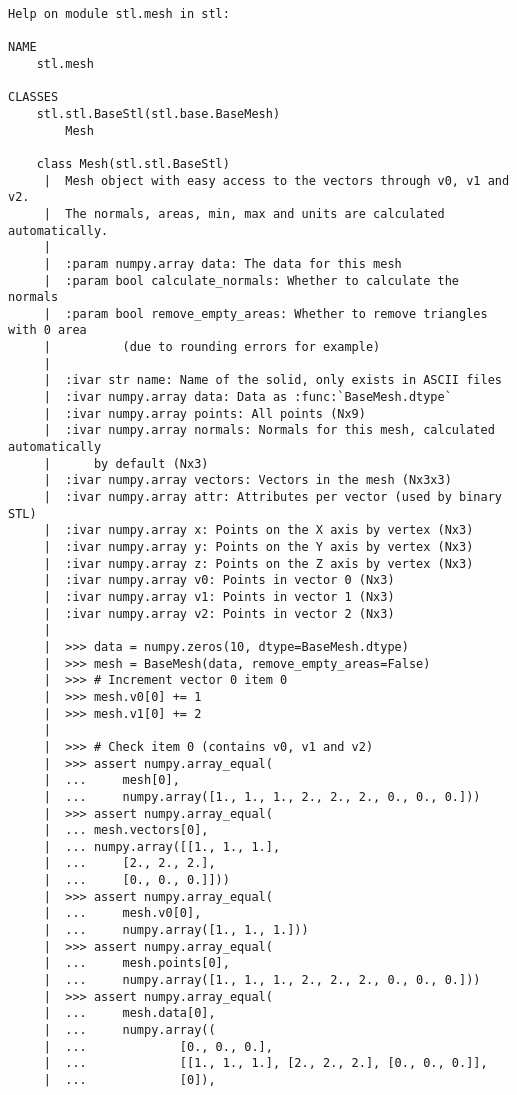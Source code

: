 \documentclass[12pt,fleqn]{article}\usepackage{../../common}
\begin{document}
\begin{verbatim}
Help on module stl.mesh in stl:

NAME
    stl.mesh

CLASSES
    stl.stl.BaseStl(stl.base.BaseMesh)
        Mesh
    
    class Mesh(stl.stl.BaseStl)
     |  Mesh object with easy access to the vectors through v0, v1 and v2.
     |  The normals, areas, min, max and units are calculated automatically.
     |  
     |  :param numpy.array data: The data for this mesh
     |  :param bool calculate_normals: Whether to calculate the normals
     |  :param bool remove_empty_areas: Whether to remove triangles with 0 area
     |          (due to rounding errors for example)
     |  
     |  :ivar str name: Name of the solid, only exists in ASCII files
     |  :ivar numpy.array data: Data as :func:`BaseMesh.dtype`
     |  :ivar numpy.array points: All points (Nx9)
     |  :ivar numpy.array normals: Normals for this mesh, calculated automatically
     |      by default (Nx3)
     |  :ivar numpy.array vectors: Vectors in the mesh (Nx3x3)
     |  :ivar numpy.array attr: Attributes per vector (used by binary STL)
     |  :ivar numpy.array x: Points on the X axis by vertex (Nx3)
     |  :ivar numpy.array y: Points on the Y axis by vertex (Nx3)
     |  :ivar numpy.array z: Points on the Z axis by vertex (Nx3)
     |  :ivar numpy.array v0: Points in vector 0 (Nx3)
     |  :ivar numpy.array v1: Points in vector 1 (Nx3)
     |  :ivar numpy.array v2: Points in vector 2 (Nx3)
     |  
     |  >>> data = numpy.zeros(10, dtype=BaseMesh.dtype)
     |  >>> mesh = BaseMesh(data, remove_empty_areas=False)
     |  >>> # Increment vector 0 item 0
     |  >>> mesh.v0[0] += 1
     |  >>> mesh.v1[0] += 2
     |  
     |  >>> # Check item 0 (contains v0, v1 and v2)
     |  >>> assert numpy.array_equal(
     |  ...     mesh[0],
     |  ...     numpy.array([1., 1., 1., 2., 2., 2., 0., 0., 0.]))
     |  >>> assert numpy.array_equal(
     |  ... mesh.vectors[0],
     |  ... numpy.array([[1., 1., 1.],
     |  ...     [2., 2., 2.],
     |  ...     [0., 0., 0.]]))
     |  >>> assert numpy.array_equal(
     |  ...     mesh.v0[0],
     |  ...     numpy.array([1., 1., 1.]))
     |  >>> assert numpy.array_equal(
     |  ...     mesh.points[0],
     |  ...     numpy.array([1., 1., 1., 2., 2., 2., 0., 0., 0.]))
     |  >>> assert numpy.array_equal(
     |  ...     mesh.data[0],
     |  ...     numpy.array((
     |  ...             [0., 0., 0.],
     |  ...             [[1., 1., 1.], [2., 2., 2.], [0., 0., 0.]],
     |  ...             [0]),

\end{verbatim}
\end{document}
